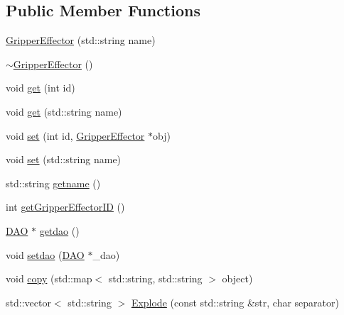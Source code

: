 \subsection*{Public Member Functions}
\begin{DoxyCompactItemize}
\item 
\hyperlink{class_gripper_effector_ae88e52bb911c09a8022bf715507403d8}{GripperEffector} (std::string name)
\item 
\hyperlink{class_gripper_effector_a1a3bdd868b44a204e87721160d94e760}{$\sim$GripperEffector} ()
\item 
void \hyperlink{class_gripper_effector_a0e8f17336a915c587ce5338db0cee9bc}{get} (int id)
\item 
void \hyperlink{class_gripper_effector_ade0d2f1e5e0a61d1550ffcc305eae11e}{get} (std::string name)
\item 
void \hyperlink{class_gripper_effector_a4a09b63049fe00adbf5105140b076987}{set} (int id, \hyperlink{class_gripper_effector}{GripperEffector} $\ast$obj)
\item 
void \hyperlink{class_gripper_effector_a03b4942326d5124b1cbad110cd54db24}{set} (std::string name)
\item 
std::string \hyperlink{class_gripper_effector_af5309596cd435c504c8ffad6d9367a2d}{getname} ()
\item 
int \hyperlink{class_gripper_effector_a51b794adb5bfdf76434316bbf70a45e7}{getGripperEffectorID} ()
\item 
\hyperlink{class_d_a_o}{DAO} $\ast$ \hyperlink{class_gripper_effector_a184c5ca2103576a291ee4bafe0c0d5a3}{getdao} ()
\item 
void \hyperlink{class_gripper_effector_acd4178b0f26deb68f18a2a22674e554f}{setdao} (\hyperlink{class_d_a_o}{DAO} $\ast$\_\-dao)
\item 
void \hyperlink{class_gripper_effector_a446ce56a6195c2b0dcccc6a6fcdd1961}{copy} (std::map$<$ std::string, std::string $>$ object)
\item 
std::vector$<$ std::string $>$ \hyperlink{class_gripper_effector_a93cffef39860f2c94a09e52531cfabc2}{Explode} (const std::string \&str, char separator)
\end{DoxyCompactItemize}


